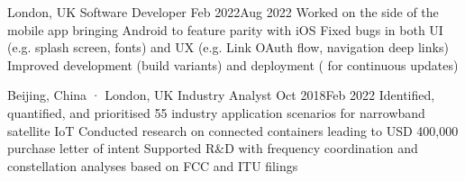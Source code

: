 

               {London, UK}
{Software Developer}                                {Feb 2022}{Aug 2022}
{Worked on the  side of the  mobile app bringing Android to feature parity with iOS}
{Fixed bugs in both UI (e.g. splash screen, fonts) and UX (e.g.  Link OAuth flow, navigation deep links)}
{Improved development (build variants) and deployment ( for continuous updates)}


       {Beijing, China · London, UK}
{Industry Analyst}                                  {Oct 2018}{Feb 2022}
{Identified, quantified, and prioritised 55 industry application scenarios for narrowband satellite IoT}
{Conducted research on connected containers leading to USD 400,000 purchase letter of intent}
{Supported R\&D with frequency coordination and constellation analyses based on FCC and ITU filings}






